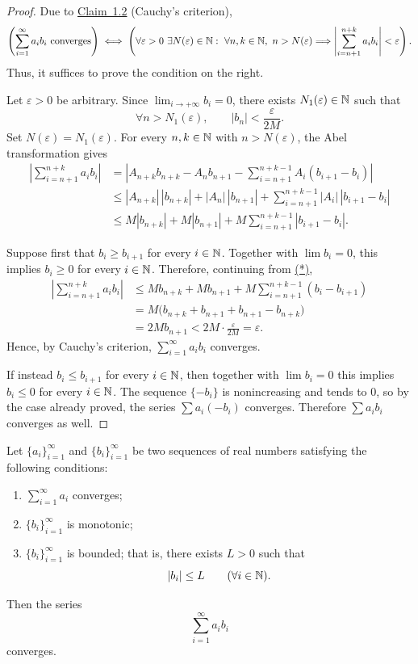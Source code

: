 \begin{proof}
Due to \hyperref[claim:1.2]{Claim~1.2} (Cauchy's criterion),
\[
\left(\sum_{i=1}^{\infty}a_i b_i\text{ converges}\right)
\iff
\left(
\forall\varepsilon>0\ \exists N(\varepsilon)\in\mathbb{N}:\
\forall n,k\in\mathbb{N},\ n>N(\varepsilon)
\Longrightarrow
\left|\sum_{i=n+1}^{n+k}a_i b_i\right|<\varepsilon
\right).
\]
Thus, it suffices to prove the condition on the right.

Let $\varepsilon>0$ be arbitrary. Since $\lim_{i\to+\infty}b_i=0$, there exists $N_1(\varepsilon)\in\mathbb{N}$ such that
\[
\forall n>N_1(\varepsilon),
\qquad |b_n|<\frac{\varepsilon}{2M}.
\]
Set $N(\varepsilon)=N_1(\varepsilon)$. For every $n,k\in\mathbb{N}$ with $n>N(\varepsilon)$, the Abel transformation gives
\begin{align*}
\left|\sum_{i=n+1}^{n+k}a_i b_i\right|
&=\left|
A_{n+k}b_{n+k}-A_n b_{n+1}
-\sum_{i=n+1}^{n+k-1}A_i(b_{i+1}-b_i)
\right|\\
&\le |A_{n+k}|\,|b_{n+k}|+|A_n|\,|b_{n+1}|
+\sum_{i=n+1}^{n+k-1}|A_i|\,|b_{i+1}-b_i|\\
&\le M|b_{n+k}|+M|b_{n+1}|
+M\sum_{i=n+1}^{n+k-1}|b_{i+1}-b_i|.
\tag{*}\label{eq:3:star:1}
\end{align*}

Suppose first that $b_i\ge b_{i+1}$ for every $i\in\mathbb{N}$. Together with $\lim b_i=0$, this implies $b_i\ge0$ for every $i\in\mathbb{N}$. Therefore, continuing from \hyperref[eq:3:star:1]{(*)},
\begin{align*}
\left|\sum_{i=n+1}^{n+k}a_i b_i\right|
&\le M b_{n+k}+M b_{n+1}
+M\sum_{i=n+1}^{n+k-1}(b_i-b_{i+1})\\
&=M\bigl(b_{n+k}+b_{n+1}+b_{n+1}-b_{n+k}\bigr)\\
&=2M b_{n+1}
<2M\cdot\frac{\varepsilon}{2M}=\varepsilon.
\end{align*}
Hence, by Cauchy's criterion, $\sum_{i=1}^{\infty}a_i b_i$ converges.

If instead $b_i\le b_{i+1}$ for every $i\in\mathbb{N}$, then together with $\lim b_i=0$ this implies $b_i\le0$ for every $i\in\mathbb{N}$. The sequence $\{-b_i\}$ is nonincreasing and tends to $0$, so by the case already proved, the series $\sum a_i(-b_i)$ converges. Therefore $\sum a_i b_i$ converges as well.
\end{proof}

\begin{claim}\label{claim:3.3}
Let $\{a_i\}_{i=1}^{\infty}$ and $\{b_i\}_{i=1}^{\infty}$ be two sequences of real numbers satisfying the following conditions:
\begin{enumerate}[label=\alph*)]
\item\label{item:claim:3.3:a} $\sum_{i=1}^{\infty}a_i$ converges;
\item\label{item:claim:3.3:b} $\{b_i\}_{i=1}^{\infty}$ is monotonic;
\item\label{item:claim:3.3:c} $\{b_i\}_{i=1}^{\infty}$ is bounded; that is, there exists $L>0$ such that
\[
|b_i|\le L\qquad(\forall i\in\mathbb{N}).
\]
\end{enumerate}
Then the series
\[
\sum_{i=1}^{\infty}a_i b_i
\]
converges.
\end{claim}

